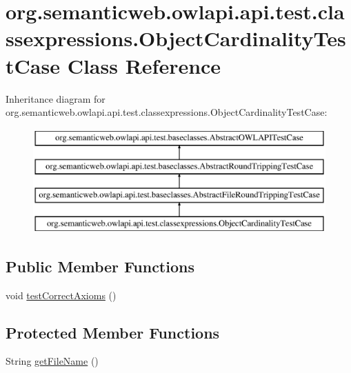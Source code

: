 \hypertarget{classorg_1_1semanticweb_1_1owlapi_1_1api_1_1test_1_1classexpressions_1_1_object_cardinality_test_case}{\section{org.\-semanticweb.\-owlapi.\-api.\-test.\-classexpressions.\-Object\-Cardinality\-Test\-Case Class Reference}
\label{classorg_1_1semanticweb_1_1owlapi_1_1api_1_1test_1_1classexpressions_1_1_object_cardinality_test_case}
}
Inheritance diagram for org.\-semanticweb.\-owlapi.\-api.\-test.\-classexpressions.\-Object\-Cardinality\-Test\-Case\-:\begin{figure}[H]
\begin{center}
\leavevmode
\includegraphics[height=4.000000cm]{classorg_1_1semanticweb_1_1owlapi_1_1api_1_1test_1_1classexpressions_1_1_object_cardinality_test_case}
\end{center}
\end{figure}
\subsection*{Public Member Functions}
\begin{DoxyCompactItemize}
\item 
void \hyperlink{classorg_1_1semanticweb_1_1owlapi_1_1api_1_1test_1_1classexpressions_1_1_object_cardinality_test_case_a4fd5d84e37bad33eeea2d0f13bd7d14b}{test\-Correct\-Axioms} ()
\end{DoxyCompactItemize}
\subsection*{Protected Member Functions}
\begin{DoxyCompactItemize}
\item 
String \hyperlink{classorg_1_1semanticweb_1_1owlapi_1_1api_1_1test_1_1classexpressions_1_1_object_cardinality_test_case_a7bba050fa42e12eff416f46ba6e6d4f0}{get\-File\-Name} ()
\end{DoxyCompactItemize}


